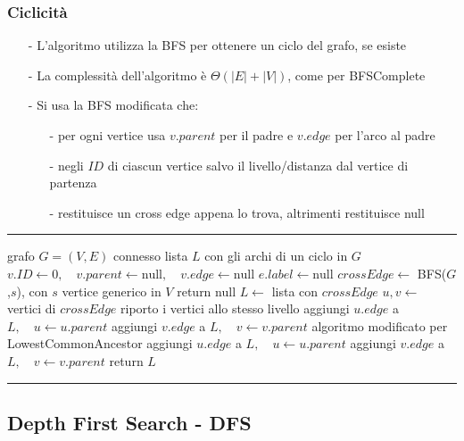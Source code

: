 \documentclass[a4paper]{article}
\makeatletter
\newenvironment{algo}[4]{
	\noindent\rule{\textwidth}{0.4pt}
	\begin{algorithmic}[1]
		\addtocounter{ALG@line}{-1}
		\Procedure{#1}{#2}
		\Require #3
		\Ensure #4
		\Statex }{
		\EndProcedure
	\end{algorithmic}
	\rule{\textwidth}{0.4pt}}
\makeatother
\begin{document}
\subsubsection*{Ciclicità}
\begin{itemize}[topsep=3pt, itemsep=0pt]
	\item[-] L'algoritmo utilizza la BFS per ottenere un ciclo del grafo, se esiste
	\item[-] La complessità dell'algoritmo è \(\Theta(|E| + |V|)\), come per BFSComplete
	\item[-] Si usa la BFS modificata che:
	\begin{itemize}[topsep=0pt, itemsep=0pt]
		\item[-] per ogni vertice usa \(v.parent\) per il padre e \(v.edge\) per l'arco al padre
		\item[-] negli \(I\!D\) di ciascun vertice salvo il livello/distanza dal vertice di partenza
		\item[-] restituisce un cross edge appena lo trova, altrimenti restituisce null
	\end{itemize}
\end{itemize}
\begin{algo}{FindCycle}{$G$}{grafo $G = (V,E)$ connesso}{lista $L$ con gli archi di un ciclo in \(G\)}
	 \(v.I\!D \gets 0, \quad v.parent \gets \text{null}, \quad v.edge \gets \text{null}\)
	\EndFor
	 \(e.label \gets \text{null}\)
	\EndFor
	\State \(crossEdge \gets\) BFS(\(G\),\(s\)), con \(s\) vertice generico in \(V\)
	 return null
	\Else
		\State \(L \gets\) lista con \(crossEdge\)
		\State \(u,v \gets\) vertici di \(crossEdge\)
		 \Comment riporto i vertici allo stesso livello
			\State aggiungi \(u.edge\) a \(L, \quad u \gets u.parent\)
			\State aggiungi \(v.edge\) a \(L, \quad v \gets v.parent\)
		\EndIf
		 \Comment algoritmo modificato per LowestCommonAncestor
			\State aggiungi \(u.edge\) a \(L, \quad u \gets u.parent\)
			\State aggiungi \(v.edge\) a \(L, \quad v \gets v.parent\)
		\EndWhile
		\State return \(L\)
	\EndIf
\end{algo}

\newpage

\subsection{Depth First Search - DFS}
\end{document}
